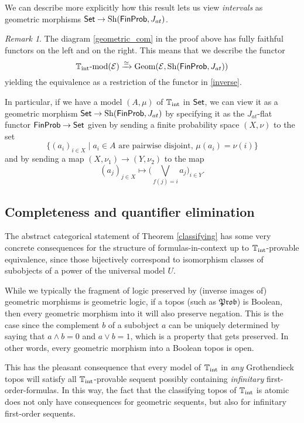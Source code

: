 \documentclass[a4paper]{amsproc}
\theoremstyle{plain}
\theoremstyle{definition}
\theoremstyle{remark}
\newtheorem{remark}[theorem]{Remark}
\numberwithin{equation}{section}
\DeclareMathOperator{\Sh}{Sh}
\DeclareMathOperator{\Geom}{Geom}
\newcommand{\Set}{\textup{\textsf{Set}}}
\newcommand{\FinProb}{\textup{\textsf{FinProb}}}
\newcommand{\Prob}{\mathfrak{Prob}}
\begin{document}
We can describe more explicitly how this result lets us view \emph{intervals} as geometric morphisms $\Set \to \Sh(\FinProb,J_{at})$.

\begin{remark} \label{classifying_equiv_data}
    The diagram \ref{geometric_com} in the proof above has fully faithful functors on the left and on the right. This means that we describe the functor
    \[
        \mathbb{T}_{\textup{int}}\textup{-mod}(\mathcal{E}) \xrightarrow{\simeq} \Geom(\mathcal{E},\Sh(\FinProb,J_{at}))
    \]
    yielding the equivalence as a restriction of the functor in \ref{inverse}.
    
    In particular, if we have a model $(A,\mu)$ of $\mathbb{T}_{\textup{int}}$ in $\Set$, we can view it as a geometric morphism $\Set \to \Sh(\FinProb, J_{at})$ by specifying it as the $J_{at}$-flat functor $\FinProb \to \Set$ given by sending a finite probability space $(X,\nu)$ to the set
    \[
    \{(a_i)_{i \in X} \mid a_i \in A \text{ are pairwise disjoint, } \mu(a_i) = \nu(i) \}
    \]
    and by sending a map $(X,\nu_1) \to (Y,\nu_2)$ to the map
    \[
    (a_j)_{j \in X} \mapsto \big (\bigvee_{f(j) = i} a_j \big )_{i \in Y} .
    \]
\end{remark}

\subsection{Completeness and quantifier elimination}

The abstract categorical statement of Theorem \ref{classifying} has some very concrete consequences for the structure of formulas-in-context up to $\mathbb{T}_{\textup{int}}$-provable equivalence, since those bijectively correspond to isomorphism classes of subobjects of a power of the universal model $U$.

While we typically the fragment of logic preserved by (inverse images of) geometric morphisms is geometric logic, if a topos (such as $\Prob$) is Boolean, then every geometric morphism into it will also preserve negation. This is the case since the complement $b$ of a subobject $a$ can be uniquely determined by saying that $a \wedge b = 0$ and $a \vee b = 1$, which is a property that gets preserved. In other words, every geometric morphism into a Boolean topos is open.

This has the pleasant consequence that every model of $\mathbb{T}_{\textup{int}}$ in \emph{any} Grothendieck topos will satisfy all $\mathbb{T}_{\textup{int}}$-provable sequent possibly containing \emph{infinitary} first-order-formulas. In this way, the fact that the classifying topos of $\mathbb{T}_{\textup{int}}$ is atomic does not only have consequences for geometric sequents, but also for infinitary first-order sequents.
\end{document}
